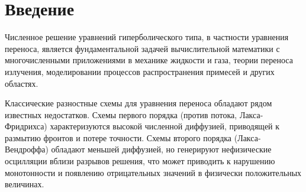 \documentclass[12pt]{article}
\begin{document}
\begin{abstract}
В работе рассматривается модификация классической схемы Лакса-Фридрихса для численного решения уравнения переноса. Предложено семество разностных схем параметризованных величиной $\sigma$, позволяющим варьировать диссипативные свойства метода. С использованием разложения по Тейлору и коррекции старших членов ошибки на пятиточечном шаблоне построена схема повышенного порядка аппроксимации.

Проведен детальный анализ устойчивости методом фон Неймана. С применением систем компьютерной алгебры (CAS) на базе библиотеки \texttt{sympy} (Python) получено аналитическое представление множителя перехода и исследована зависимость области устойчивости от параметров схемы $(\nu, \sigma)$. Установлены необходимые и достаточные условия устойчивости.

Численно исследован порядок сходимости схемы, подтверждающий теоретические оценки. Схема сравнивается со сквозными разностными схемами, в частности, со схемой Русанова третьего порядка. Для подавления нефизических осцилляций вблизи разрывов предложены два подхода монотонизации: метод адаптивной искусственной вязкости и гибридная схема, комбинирующая решения высокого и низкого порядков.

Численные эксперименты демонстрируют эффективность предложенных методов как на гладких, так и на разрывных решениях.
\end{abstract}



\section{Введение}

Численное решение уравнений гиперболического типа, в частности уравнения переноса, является фундаментальной задачей вычислительной математики с многочисленными приложениями в механике жидкости и газа, теории переноса излучения, моделировании процессов распространения примесей и других областях.

Классические разностные схемы для уравнения переноса обладают рядом известных недостатков. Схемы первого порядка (против потока, Лакса-Фридрихса) характеризуются высокой численной диффузией, приводящей к размытию фронтов и потере точности. Схемы второго порядка (Лакса-Вендроффа) обладают меньшей диффузией, но генерируют нефизические осцилляции вблизи разрывов решения, что может приводить к нарушению монотонности и появлению отрицательных значений в физически положительных величинах.
\end{document}
